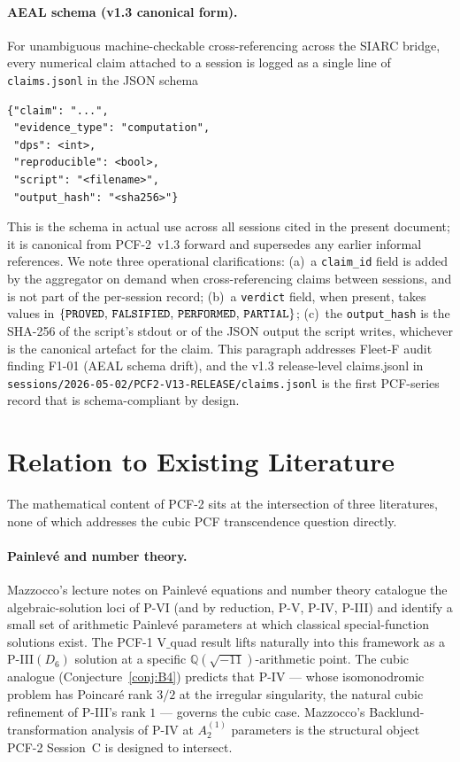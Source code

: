\documentclass[11pt,a4paper]{article}
\theoremstyle{definition}
\theoremstyle{remark}
\newcommand{\Q}{\mathbb{Q}}
\begin{document}
\paragraph{AEAL schema (v1.3 canonical form).}\label{para:aeal-schema}
For unambiguous machine-checkable cross-referencing across the SIARC
bridge, every numerical claim attached to a session is logged as a
single line of \texttt{claims.jsonl} in the JSON schema
\begin{verbatim}
{"claim": "...",
 "evidence_type": "computation",
 "dps": <int>,
 "reproducible": <bool>,
 "script": "<filename>",
 "output_hash": "<sha256>"}
\end{verbatim}
This is the schema in actual use across all sessions cited in the
present document; it is canonical from PCF-2~v1.3 forward and
supersedes any earlier informal references. We note three operational
clarifications: (a)~a \texttt{claim\_id} field is added by the
aggregator on demand when cross-referencing claims between sessions,
and is not part of the per-session record; (b)~a \texttt{verdict}
field, when present, takes values in
$\{\text{\texttt{PROVED}},\,\text{\texttt{FALSIFIED}},\,
   \text{\texttt{PERFORMED}},\,\text{\texttt{PARTIAL}}\}$;
(c)~the \texttt{output\_hash} is the SHA-256 of the script's stdout
or of the JSON output the script writes, whichever is the canonical
artefact for the claim. This paragraph addresses Fleet-F audit
finding F1-01 (AEAL schema drift), and the v1.3 release-level
claims.jsonl in
\texttt{sessions/2026-05-02/PCF2-V13-RELEASE/claims.jsonl} is the
first PCF-series record that is schema-compliant by design.

\section{Relation to Existing Literature}\label{sec:litrel}

The mathematical content of PCF-2 sits at the intersection of three
literatures, none of which addresses the cubic PCF transcendence
question directly.

\paragraph{Painlev\'e and number theory.}
Mazzocco's lecture notes on Painlev\'e equations and number theory
\cite{Mazzocco2003} catalogue the algebraic-solution loci of P-VI
(and by reduction, P-V, P-IV, P-III) and identify a small set of
arithmetic Painlev\'e parameters at which classical special-function
solutions exist. The PCF-1 V$\_$quad result lifts naturally into
this framework as a P-III$(D_{6})$ solution at a specific
$\Q(\sqrt{-11})$-arithmetic point. The cubic analogue
(Conjecture~\ref{conj:B4}) predicts that P-IV --- whose isomonodromic
problem has Poincar\'e rank $3/2$ at the irregular singularity, the
natural cubic refinement of P-III's rank $1$ --- governs the cubic
case. Mazzocco's Backlund-transformation analysis of P-IV at $A_{2}^{(1)}$
parameters is the structural object PCF-2 Session~C is designed to
intersect.
\end{document}

